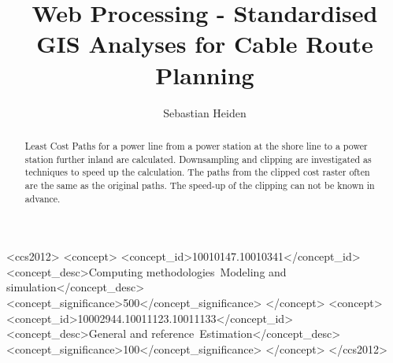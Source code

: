 \documentclass[acmtog]{acmart}
\begin{document}
	\title{Web Processing - Standardised GIS Analyses for Cable Route Planning}
	
	\author{Sebastian Heiden}
	
	
	\renewcommand{\shortauthors}{Heiden}
	
	\begin{abstract}
		Least Cost Paths for a power line from a power station at the shore line to a power station further inland are calculated.
		Downsampling and clipping are investigated as techniques to speed up the calculation.
		The paths from the clipped cost raster often are the same as the original paths.
		The speed-up of the clipping can not be known in advance.
	\end{abstract}
	
	\begin{CCSXML}
		<ccs2012>
		<concept>
		<concept_id>10010147.10010341</concept_id>
		<concept_desc>Computing methodologies~Modeling and simulation</concept_desc>
		<concept_significance>500</concept_significance>
		</concept>
		<concept>
		<concept_id>10002944.10011123.10011133</concept_id>
		<concept_desc>General and reference~Estimation</concept_desc>
		<concept_significance>100</concept_significance>
		</concept>
		</ccs2012>
	\end{CCSXML}
	


	
	
	
	\maketitle
	
\end{document}
